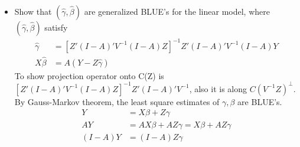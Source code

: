 \begin{itemize}
\begin{align*}
B^2 &= \left(A + (I-A)Z [Z'(I-A)' V^{-1} (I-A)Z]^{-1} Z'(I-A)'V^{-1} \right) \left(A + (I-A)Z [Z'(I-A)' V^{-1} (I-A)Z]^{-1} Z'(I-A)'V^{-1} \right) \\
&= \left(A + (I-A)Z [Z'(I-A)' V^{-1} (I-A)Z]^{-1} Z'(I-A)'V^{-1} \right) = B\\
A(I-A) & = 0\\
\end{align*}
Show  $B (X, Z) = (BX, BZ) = (X, Z)$.
\begin{align*}
BX &= \left(A + (I-A)Z [Z'(I-A)' V^{-1} (I-A)Z]^{-1} Z'(I-A)'V^{-1} \right) X\\
&= AX + (I-A)Z [Z'(I-A)' V^{-1} (I-A)Z]^{-1} Z'(I-A)'V^{-1} (I-A)  X =X , \qquad \text{part (a)}\\
BZ &= \left(A + (I-A)Z [Z'(I-A)' V^{-1} (I-A)Z]^{-1} Z'(I-A)'V^{-1} \right) Z\\
&= AZ + (I-A)Z [Z'(I-A)' V^{-1} (I-A)Z]^{-1} Z'(I-A)'V^{-1} (I-A)Z = AZ + (I-A)Z = Z, \quad \text{part (a)}
\end{align*}
Next show projection along $C(V^{-1} (X,Z))^{\perp}$. 
\begin{align*}
(V^{-1} (X,Z))'w &= 0, \qquad X' V^{-1} w = 0, Z' V^{-1} w = 0\\
Bw &= \left(A + (I-A)Z [Z'(I-A)' V^{-1} (I-A)Z]^{-1} Z'(I-A)'V^{-1} \right) w= 0 \\
&= Aw + (I-A)Z [Z'(I-A)' V^{-1} (I-A)Z]^{-1} Z'(I-A)'V^{-1} w = 0\\
(X,Z)' V^{-1} B &= 0, \qquad B \perp  C(V^{-1} (X,Z))
\end{align*}
\item[(d)] Show that $(\hat{\gamma}, \hat{\beta})$ are generalized BLUE's for the linear model, where $(\hat{\gamma}, \hat{\beta})$ satisfy
\begin{align*}
\hat{\gamma} &= [Z'(I-A)' V^{-1} (I-A)Z]^{-1} Z'(I-A)' V^{-1} (I-A)Y\\
X\hat{\beta} &= A(Y-Z \hat{\gamma})
\end{align*}
To show projection operator onto C(Z) is $[Z'(I-A)' V^{-1} (I-A)Z]^{-1} Z'(I-A)' V^{-1}$, also it is along $C(V^{-1} Z)^{\perp}$.\\
By Gauss-Markov theorem, the least square estimates of $\gamma, \beta$ are BLUE's. 
\begin{align*}
Y &= X\beta + Z\gamma \\
AY &= AX\beta + AZ\gamma = X\beta + AZ\gamma \\
(I-A)Y &= (I-A)Z \gamma\\
\end{align*}

\end{itemize}
